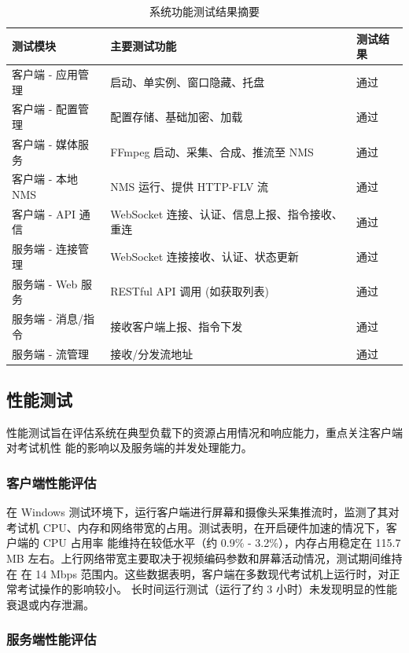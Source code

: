 \begin{table}[hbtp]
  \centering
  \caption{系统功能测试结果摘要}
  \label{tab:functional_summary}
  \begin{tabular}{lll}
    \toprule
    \textbf{测试模块} & \textbf{主要测试功能} & \textbf{测试结果} \\
    \midrule
    客户端 - 应用管理 & 启动、单实例、窗口隐藏、托盘 & 通过 \\
    客户端 - 配置管理 & 配置存储、基础加密、加载 & 通过\\ %
    客户端 - 媒体服务 & FFmpeg 启动、采集、合成、推流至 NMS & 通过 \\
    客户端 - 本地 NMS & NMS 运行、提供 HTTP-FLV 流 & 通过\\ %
    客户端 - API 通信 & WebSocket 连接、认证、信息上报、指令接收、重连 & 通过 \\ %
    服务端 - 连接管理 & WebSocket 连接接收、认证、状态更新 & 通过 \\
    服务端 - Web 服务 & RESTful API 调用 (如获取列表) & 通过 \\
    服务端 - 消息/指令 & 接收客户端上报、指令下发 & 通过 \\
    服务端 - 流管理 & 接收/分发流地址 & 通过 \\
    \bottomrule
  \end{tabular}
\end{table}

\subsection{性能测试}

性能测试旨在评估系统在典型负载下的资源占用情况和响应能力，重点关注客户端对考试机性
能的影响以及服务端的并发处理能力。

\subsubsection{客户端性能评估}

在 Windows 测试环境下，运行客户端进行屏幕和摄像头采集推流时，监测了其对考试机
CPU、内存和网络带宽的占用。测试表明，在开启硬件加速的情况下，客户端的 CPU 占用率
能维持在较低水平（约 0.9\%
- 3.2\%），内存占用稳定在 115.7 
MB 左右。上行网络带宽主要取决于视频编码参数和屏幕活动情况，测试期间维持在
在 14 Mbps 范围内。这些数据表明，客户端在多数现代考试机上运行时，对正常考试操作的影响较小。
长时间运行测试（运行了约 3 小时）未发现明显的性能衰退或内存泄漏。

\subsubsection{服务端性能评估}

